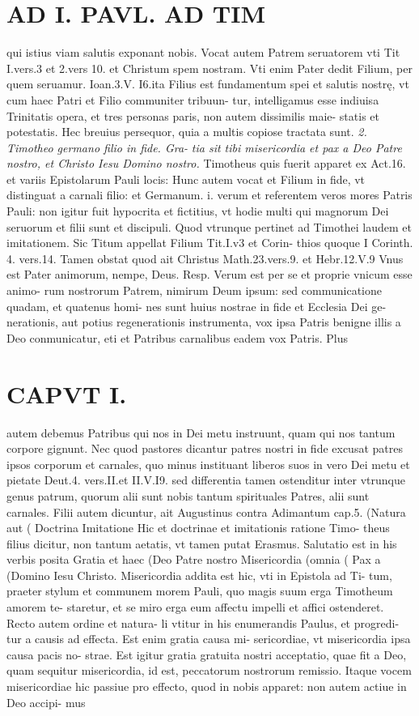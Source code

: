 \documentclass{article}
\begin{document}
\begin{pages}
\section*{AD I. PAVL. AD TIM }qui istius viam salutis exponant nobis. Vocat autem Patrem seruatorem vti Tit I.vers.3 et 2.vers 10. et Christum spem nostram. Vti enim Pater dedit Filium, per quem seruamur. Ioan.3.V. I6.ita Filius est fundamentum spei et salutis nostrę, vt cum haec Patri et Filio communiter tribuun- tur, intelligamus esse indiuisa Trinitatis opera, et tres personas paris, non autem dissimilis maie- statis et potestatis. Hec breuius persequor, quia a multis copiose tractata sunt. \textit{2. Timotheo germano filio in fide. Gra-} \textit{tia sit tibi misericordia et pax a Deo Patre} \textit{nostro, et Christo Iesu Domino nostro.} Timotheus quis fuerit apparet ex Act.16. et variis Epistolarum Pauli locis: Hunc autem vocat et Filium in fide, vt distinguat a carnali filio: et Germanum. i. verum et referentem veros mores Patris Pauli: non igitur fuit hypocrita et fictitius, vt hodie multi qui magnorum Dei seruorum et filii sunt et discipuli. Quod vtrunque pertinet ad Timothei laudem et imitationem. Sic Titum appellat Filium Tit.I.v3 et Corin- thios quoque I Corinth. 4. vers.14. Tamen obstat quod ait Christus Math.23.vers.9. et Hebr.12.V.9 Vnus est Pater animorum, nempe, Deus. Resp. Verum est per se et proprie vnicum esse animo- rum nostrorum Patrem, nimirum Deum ipsum: sed communicatione quadam, et quatenus homi- nes sunt huius nostrae in fide et Ecclesia Dei ge- nerationis, aut potius regenerationis instrumenta, vox ipsa Patris benigne illis a Deo conmunicatur, eti et Patribus carnalibus eadem vox Patris. Plus 
\section*{CAPVT I. }
\marginpar{[ p.5 ]}autem debemus Patribus qui nos in Dei metu instruunt, quam qui nos tantum corpore gignunt. Nec quod pastores dicantur patres nostri in fide excusat patres ipsos corporum et carnales, quo minus instituant liberos suos in vero Dei metu et pietate Deut.4. vers.II.et II.V.I9. sed differentia tamen ostenditur inter vtrunque genus patrum, quorum alii sunt nobis tantum spirituales Patres, alii sunt carnales. Filii autem dicuntur, ait Augustinus contra Adimantum cap.5. (Natura aut ( Doctrina Imitatione Hic et doctrinae et imitationis ratione Timo- theus filius dicitur, non tantum aetatis, vt tamen putat Erasmus. Salutatio est in his verbis posita Gratia et haec (Deo Patre nostro Misericordia (omnia ( Pax a (Domino Iesu Christo. Misericordia addita est hic, vti in Epistola ad Ti- tum, praeter stylum et communem morem Pauli, quo magis suum erga Timotheum amorem te- staretur, et se miro erga eum affectu impelli et affici ostenderet. Recto autem ordine et natura- li vtitur in his enumerandis Paulus, et progredi- tur a causis ad effecta. Est enim gratia causa mi- sericordiae, vt misericordia ipsa causa pacis no- strae. Est igitur gratia gratuita nostri acceptatio, quae fit a Deo, quam sequitur misericordia, id est, peccatorum nostrorum remissio. Itaque vocem misericordiae hic passiue pro effecto, quod in nobis apparet: non autem actiue in Deo accipi- mus 
\marginpar{[ p.6 ]}

\end{pages}
\end{document}
